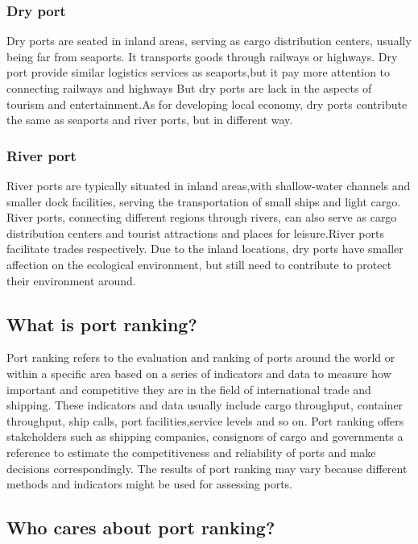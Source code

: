 \documentclass[preprint]{elsarticle}
\begin{document}
\subsubsection{Dry port}

Dry ports are seated in inland areas, serving as cargo distribution centers, usually being far from seaports. It transports goods through railways or highways. Dry port provide similar logistics services as seaports,but it pay more attention to connecting railways and highways
But dry ports are lack in the aspects of tourism and entertainment.As for developing local economy, dry ports contribute the same as seaports and river ports, but in different way.

\subsubsection{River port}

River ports are typically situated in inland areas,with shallow-water channels and smaller dock facilities, serving the transportation of small ships and light cargo. River ports, connecting different regions through rivers, can also serve as cargo distribution centers and tourist attractions and places for leisure.River ports facilitate trades respectively. Due to the inland locations, dry ports have smaller affection on the ecological environment, but still need to contribute to protect their environment around.

\subsection{What is port ranking?}

Port ranking refers to the evaluation and ranking of ports around the world or within a specific area based on a series of indicators and data to measure how important and competitive they are in the field of international trade and shipping. These indicators and data usually include cargo throughput, container throughput, ship calls, port facilities,service levels and so on. Port ranking offers stakeholders such as shipping companies, consignors of cargo and governments a reference to estimate the competitiveness and reliability of ports and make  decisions correspondingly. The results of port ranking may vary because different methods and indicators might be used for assessing ports.

\subsection{Who cares about port ranking?}
\end{document}
